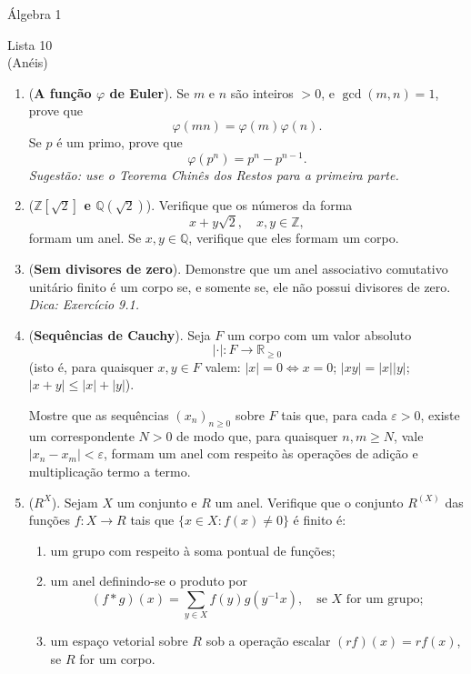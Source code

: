 \documentclass[a4paper,12pt]{article}
\begin{document}
\begin{center}
    \large Álgebra 1
\end{center}

\begin{center}
    \large Lista 10 \\
    \small (Anéis)
\end{center}
  
\begin{enumerate}[label=10.\arabic*.]

    \item (\textbf{A função $\varphi$ de Euler}). Se $m$ e $n$ são inteiros $> 0$, e $\gcd(m,n) = 1$, prove que 
    \[
    \varphi(mn) = \varphi(m)\varphi(n).
    \] 
    Se $p$ é um primo, prove que 
    \[
    \varphi(p^n) = p^n - p^{n-1}.
    \] 
    \textit{Sugestão: use o Teorema Chinês dos Restos para a primeira parte.} 

    \item (\textbf{$\mathbb{Z}[\sqrt{2}]$ e $\mathbb{Q}(\sqrt{2})$}). Verifique que os números da forma 
    \[
    x + y\sqrt{2}, \quad x,y \in \mathbb{Z},
    \] 
    formam um anel. Se $x,y \in \mathbb{Q}$, verifique que eles formam um corpo. 

    \item (\textbf{Sem divisores de zero}). Demonstre que um anel associativo comutativo unitário finito é um corpo se, e somente se, ele não possui divisores de zero. \textit{Dica: Exercício 9.1.} 

    \item (\textbf{Sequências de Cauchy}). Seja $F$ um corpo com um valor absoluto 
    \[
    |\cdot| : F \to \mathbb{R}_{\geq 0}
    \] 
    (isto é, para quaisquer $x,y \in F$ valem: $|x|=0 \iff x=0$; $|xy| = |x||y|$; $|x+y| \leq |x|+|y|$). 

    Mostre que as sequências $(x_n)_{n \geq 0}$ sobre $F$ tais que, para cada $\varepsilon > 0$, existe um correspondente $N > 0$ de modo que, para quaisquer $n,m \geq N$, vale $|x_n - x_m| < \varepsilon$, formam um anel com respeito às operações de adição e multiplicação termo a termo. 

    \item (\textbf{$R^X$}). Sejam $X$ um conjunto e $R$ um anel. Verifique que o conjunto $R^{(X)}$ das funções $f: X \to R$ tais que $\{x \in X : f(x) \neq 0\}$ é finito é: 
    \begin{enumerate}[label=(\roman*)]
        \item um grupo com respeito à soma pontual de funções; 
        \item um anel definindo-se o produto por 
        \[
        (f*g)(x) = \sum_{y \in X} f(y)g(y^{-1}x), \quad \text{se $X$ for um grupo};
        \] 
        \item um espaço vetorial sobre $R$ sob a operação escalar $(rf)(x) = r f(x)$, se $R$ for um corpo.
    \end{enumerate}


\end{enumerate}
\end{document}
